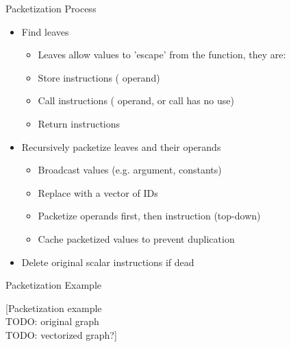
\begin{frame}{Packetization Process}

\begin{itemize}
    \item Find leaves
    \begin{itemize}
        \item Leaves allow  values to 'escape' from the function, they are:
        \item Store instructions ( operand)
        \item Call instructions ( operand, or call has no use)
        \item Return instructions
    \end{itemize}
\end{itemize}

\begin{itemize}
    \item Recursively packetize leaves and their operands
    \begin{itemize}
        \item Broadcast  values (e.g. argument, constants)
        \item Replace  with a vector of IDs
        \item Packetize operands first, then instruction (top-down)
        \item Cache packetized values to prevent duplication
    \end{itemize}
\end{itemize}

\begin{itemize}
    \item Delete original scalar instructions if dead
\end{itemize}

\end{frame}


\begin{frame}[c]{Packetization Example}

[Packetization example \\
TODO: original graph \\
TODO: vectorized graph?]

\end{frame}

